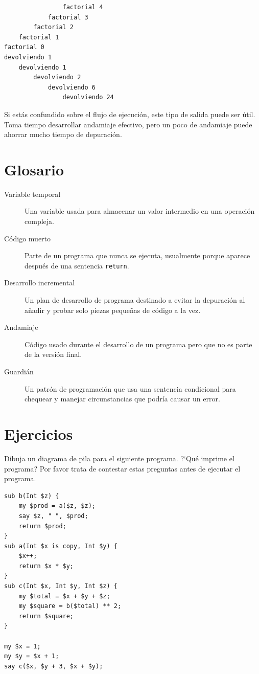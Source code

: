 \begin{lstlisting}
                factorial 4
            factorial 3
        factorial 2
    factorial 1
factorial 0
devolviendo 1
    devolviendo 1
        devolviendo 2
            devolviendo 6
                devolviendo 24
\end{lstlisting}
%
Si estás confundido sobre el flujo de ejecución, este tipo
de salida puede ser útil. Toma tiempo desarrollar andamiaje 
efectivo, pero un poco de andamiaje puede ahorrar mucho 
tiempo de depuración.

\section{Glosario}

\begin{description}

\item[Variable temporal]  Una variable usada para almacenar un valor
intermedio en una operación compleja.

\item[Código muerto]  Parte de un programa que nunca se ejecuta, usualmente
porque aparece después de una sentencia {\tt return}.

\item[Desarrollo incremental]  Un plan de desarrollo de programa 
destinado a evitar la depuración al añadir y probar solo piezas
pequeñas de código a la vez.

\item[Andamiaje]  Código usado durante el desarrollo de un programa
pero que no es parte de la versión final.

\item[Guardián]  Un patrón de programación que usa una sentencia
condicional para chequear y manejar circunstancias que podría causar
un error.

\end{description}


\section{Ejercicios}

\begin{exercise}

Dibuja un diagrama de pila para el siguiente programa.
?`Qué imprime el programa? Por favor trata de contestar estas
preguntas antes de ejecutar el programa.

\begin{lstlisting}
sub b(Int $z) {
    my $prod = a($z, $z);
    say $z, " ", $prod;
    return $prod;
}
sub a(Int $x is copy, Int $y) {
    $x++;
    return $x * $y;
}
sub c(Int $x, Int $y, Int $z) {
    my $total = $x + $y + $z;
    my $square = b($total) ** 2;
    return $square;
}

my $x = 1;
my $y = $x + 1;
say c($x, $y + 3, $x + $y);
\end{lstlisting}

\end{exercise}


